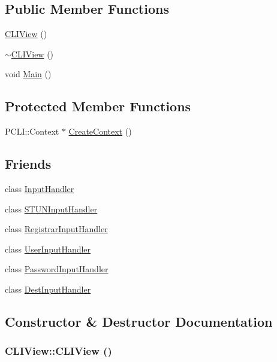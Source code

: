 \subsection*{Public Member Functions}
\begin{CompactItemize}
\item 
\hyperlink{classCLIView_53a3e66d584e90bb56f6e2266cbb5a6e}{CLIView} ()
\item 
\hyperlink{classCLIView_a2bfd6634095fd475ef131931aa8790c}{$\sim$CLIView} ()
\item 
void \hyperlink{classCLIView_e2c5d82a57753fee09f7fd20a14dd0db}{Main} ()
\end{CompactItemize}
\subsection*{Protected Member Functions}
\begin{CompactItemize}
\item 
PCLI::Context $\ast$ \hyperlink{classCLIView_56c18f1bd74cd25f293012457c7238eb}{CreateContext} ()
\end{CompactItemize}
\subsection*{Friends}
\begin{CompactItemize}
\item 
class \hyperlink{classCLIView_28c677eee06763681231ba62273b9fad}{InputHandler}
\item 
class \hyperlink{classCLIView_f9b3716dfe24382734846514b4626d04}{STUNInputHandler}
\item 
class \hyperlink{classCLIView_b160fef2c62aedd8169bf5670f1f291c}{RegistrarInputHandler}
\item 
class \hyperlink{classCLIView_17c53d72a733c0a2f0cc2103459d5aec}{UserInputHandler}
\item 
class \hyperlink{classCLIView_3351b3e1913bdd8c10a93b404ae26108}{PasswordInputHandler}
\item 
class \hyperlink{classCLIView_e9e28ac818dc78f00dff5c15398ff3ae}{DestInputHandler}
\end{CompactItemize}


\subsection{Constructor \& Destructor Documentation}
\hypertarget{classCLIView_53a3e66d584e90bb56f6e2266cbb5a6e}{
\subsubsection[{CLIView}]{\setlength{\rightskip}{0pt plus 5cm}CLIView::CLIView ()}}
\label{classCLIView_53a3e66d584e90bb56f6e2266cbb5a6e}


